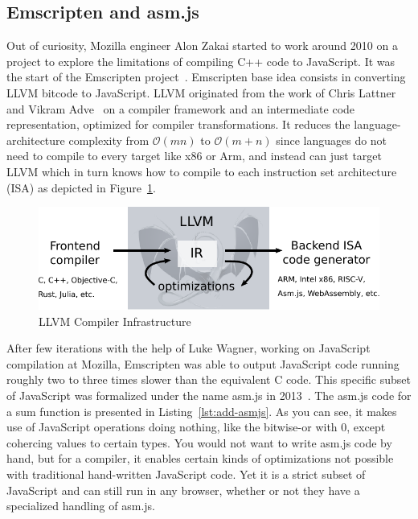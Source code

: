 \subsection{Emscripten and asm.js}%
\label{sub:emscripten-asmjs}

Out of curiosity, Mozilla engineer Alon Zakai started to work around 2010
on a project to explore the limitations of compiling C++ code to JavaScript.
It was the start of the Emscripten project~\cite{zakai2011emscripten}.
Emscripten base idea consists in converting LLVM bitcode to JavaScript.
LLVM originated from the work of
Chris Lattner and Vikram Adve~\cite{lattner2004llvm} on a compiler framework
and an intermediate code representation, optimized for compiler transformations.
It reduces the language-architecture complexity from $\mathcal{O}(mn)$ to $\mathcal{O}(m+n)$
since languages do not need to compile to every target like x86 or Arm,
and instead can just target LLVM which in turn knows how to compile to each
instruction set architecture (ISA) as depicted in Figure~\ref{fig:llvm}.

\begin{figure}[h]
	\centering
	\includegraphics[width=\linewidth]{assets/img/llvm.pdf}
	\caption{LLVM Compiler Infrastructure}%
	\label{fig:llvm}
\end{figure}

After few iterations with the help of Luke Wagner, working on JavaScript compilation at Mozilla,
Emscripten was able to output JavaScript code
running roughly two to three times slower than the equivalent C code.
This specific subset of JavaScript was formalized under the name asm.js in 2013~\cite{herman2013asm}.
The asm.js code for a sum function is presented in Listing~\ref{lst:add-asmjs}.
As you can see, it makes use of JavaScript operations doing nothing,
like the bitwise-or with 0, except cohercing values to certain types.
You would not want to write asm.js code by hand, but for a compiler,
it enables certain kinds of optimizations not possible with traditional
hand-written JavaScript code.
Yet it is a strict subset of JavaScript and can still run in any browser,
whether or not they have a specialized handling of asm.js.


